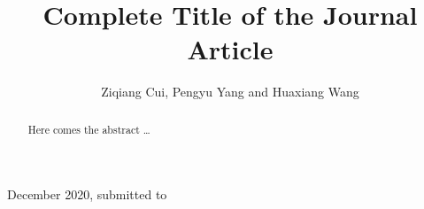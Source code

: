 \documentclass[12pt]{iopart}
\begin{document}



\title[Short title]{Complete Title of the Journal Article}

\author{Ziqiang Cui, Pengyu Yang and Huaxiang Wang}

\address{Tianjin Key Laboratory of Process Measurement and Control, School of Electrical and Information Engineering
Tianjin University
Tianjin 300072, China}
\vspace{10pt}
\begin{indented}
\item[]December 2020, submitted to \MST
\end{indented}

\begin{abstract}
 Here comes the abstract \dots
\end{abstract}


















\end{document}
